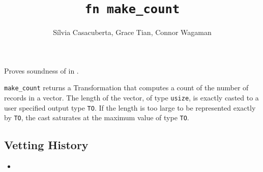 \documentclass{article}
\title{\texttt{fn make\_count}}
\author{S\'ilvia Casacuberta, Grace Tian, Connor Wagaman}
\date{}
\begin{document}
\maketitle

\contrib
Proves soundness of  in .

\texttt{make\_count} returns a Transformation that computes a count of the number of records in a vector.
The length of the vector, of type \texttt{usize}, is exactly casted to a user specified output type \texttt{TO}.
If the length is too large to be represented exactly by \texttt{TO}, 
the cast saturates at the maximum value of type \texttt{TO}.

\subsection*{Vetting History}
\begin{itemize}
    \item {}
\end{itemize}
\end{document}
